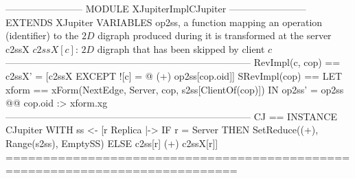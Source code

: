\documentclass{article}
\begin{document}
\begin{tla}
------------------------ MODULE XJupiterImplCJupiter ------------------------
EXTENDS XJupiter
VARIABLES op2ss, \* a function mapping an operation (identifier)
                 \* to the $2D$ digraph produced during it is transformed at the server
          c2ssX  \* $c2ssX[c]$: $2D$ digraph that has been skipped by client $c$
-----------------------------------------------------------------------------
RevImpl(c, cop) == c2ssX' = [c2ssX EXCEPT ![c] = @ (+) op2ss[cop.oid]] 
SRevImpl(cop) == LET xform == xForm(NextEdge, Server, cop, s2ss[ClientOf(cop)])
                 IN op2ss' = op2ss @@ cop.oid :> xform.xg
-----------------------------------------------------------------------------
CJ == INSTANCE CJupiter WITH ss <- [r \in Replica |->
                   IF r = Server THEN SetReduce((+), Range(s2ss), EmptySS)
                                 ELSE c2ss[r] (+) c2ssX[r]]
=============================================================================
\end{tla}
\end{document}
